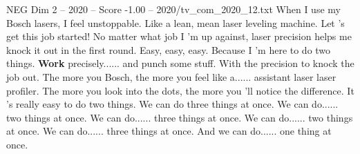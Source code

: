 \begin{textsample}{NEG Dim 2 – 2020 – Score -1.00 – 2020/tv\_com\_2020\_12.txt}  \label{ex:f2_neg_033}
When I use my Bosch lasers, I feel unstoppable.
Like a lean, mean laser leveling machine.
Let 's get this job started!
No matter what job I 'm up against, laser precision helps me knock it out in the first round.
Easy, easy, easy.
Because I 'm here to do two things. \textbf{Work} precisely...... and punch some stuff.
With the precision to knock the job out.
The more you Bosch, the more you feel like a...... assistant laser laser profiler.
The more you look into the dots, the more you 'll notice the difference.
It 's really easy to do two things.
We can do three things at once.
We can do...... two things at once.
We can do...... three things at once.
We can do...... two things at once.
We can do...... three things at once.
And we can do...... one thing at once.

\end{textsample}
